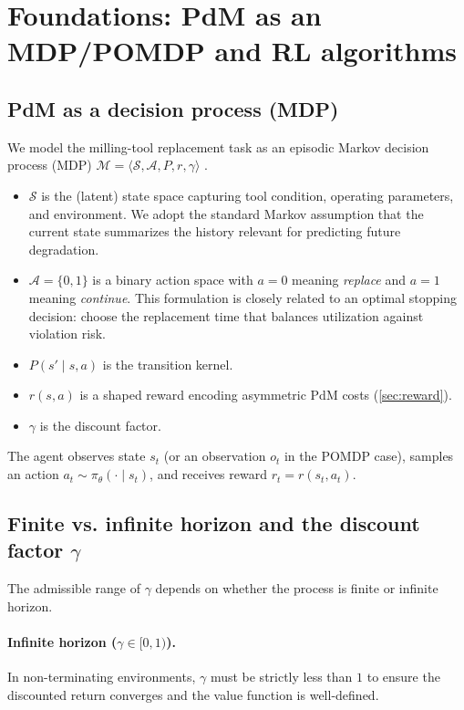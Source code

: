 \documentclass[11pt]{article}
\begin{document}
\section{Foundations: PdM as an MDP/POMDP and RL algorithms}
\label{sec:foundations}
\subsection{PdM as a decision process (MDP)}
\label{sec:mdp}
We model the milling-tool replacement task as an episodic Markov decision process (MDP)
$\mathcal{M}=\langle \mathcal{S},\mathcal{A},P,r,\gamma\rangle$ \parencite{SuttonBarto2018}.

\begin{itemize}
\item $\mathcal{S}$ is the (latent) state space capturing tool condition, operating parameters, and environment. We adopt the standard Markov assumption that the current state summarizes the history relevant for predicting future degradation.
\item $\mathcal{A}=\{0,1\}$ is a binary action space with $a=0$ meaning \emph{replace} and $a=1$ meaning \emph{continue}. This formulation is closely related to an optimal stopping decision: choose the replacement time that balances utilization against violation risk.
\item $P(s'\mid s,a)$ is the transition kernel.
\item $r(s,a)$ is a shaped reward encoding asymmetric PdM costs (\cref{sec:reward}).
\item $\gamma$ is the discount factor.
\end{itemize}

The agent observes state $s_t$ (or an observation $o_t$ in the POMDP case), samples an action $a_t\sim\pi_\theta(\cdot\mid s_t)$, and receives reward $r_t=r(s_t,a_t)$.

\subsection{Finite vs. infinite horizon and the discount factor $\gamma$}
\label{sec:gamma}
The admissible range of $\gamma$ depends on whether the process is finite or infinite horizon.

\paragraph{Infinite horizon ($\gamma\in[0,1)$).}
In non-terminating environments, $\gamma$ must be strictly less than $1$ to ensure the discounted return converges and the value function is well-defined.
\end{document}
